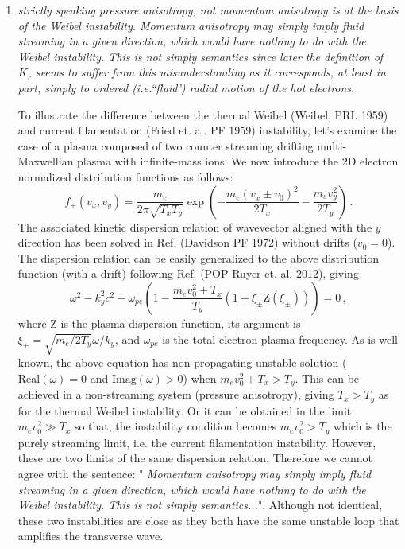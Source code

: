 \documentclass[aps,showpacs,superscriptaddress]{revtex4}%
\begin{document}
\begin{enumerate}
\item \textit{strictly speaking pressure anisotropy, not momentum anisotropy is at the basis of the Weibel instability. Momentum anisotropy may simply imply fluid streaming in a given direction, which would have nothing to do with the Weibel instability. This is not simply semantics since later the definition of $K_r$ seems to suffer from this misunderstanding as it corresponds, at least in part, simply to ordered (i.e.``fluid') radial motion of the hot electrons. }

To illustrate the difference between the thermal Weibel (Weibel, PRL 1959) and current filamentation (Fried et. al. PF 1959) instability, let's examine the case of a plasma composed of two counter streaming drifting multi-Maxwellian plasma with infinite-mass ions.
We now introduce the 2D electron normalized  distribution functions as follows:
 \begin{equation}
f_{ \pm}(v_x, v_y)  = \frac{ m_e }{2 \pi \sqrt{  T_x T_y  } }\exp\left( -\frac{ m_e (v_x \pm v_0)^2 }{ 2T_x }  -  \frac{ m_e v_y^2 }{ 2 T_y }\right) \, .
 \end{equation}
The associated kinetic dispersion relation of wavevector aligned with the $y$ direction has been solved in Ref.  (Davidson PF 1972) without drifts ($v_0=0$). The dispersion relation can be easily generalized to the above distribution function (with a drift)
following Ref. (POP Ruyer et. al. 2012),  giving
 \begin{equation}
 \omega^2 -k_y^2c^2 -  \omega_{pe}\left( 
1 -  \frac{ m_e v_0^2  + T_x }{ T_y }  ( 1 +\xi_\pm \mathrm{ Z }(\xi_\pm)  ) 
\right) =0 \, ,
 \end{equation}
where $ \mathrm{ Z }$ is the plasma dispersion function, its argument is $\xi_\pm =\sqrt{  m_e/2 T_y  }   \omega/k_y$, and 
$\omega_{pe}$ is the total electron plasma frequency. As is well known, the above equation has non-propagating unstable solution ($\mathrm{Real}(\omega)=0$ and $\mathrm{Imag}(\omega)>0$) when $m_e v_0^2  + T_x > T_y$.
This can be achieved in a non-streaming system (pressure anisotropy), giving $T_x > T_y$ as for the thermal Weibel instability. 
Or it can be obtained in the limit $m_e v_0^2  \gg T_x$ so that, the instability condition becomes  $m_e v_0^2  > T_y$ which is the purely streaming limit, i.e.  the current filamentation instability.
However, these are two limits of the same dispersion relation. Therefore we cannot agree with the sentence: " \textit{Momentum anisotropy may simply imply fluid streaming in a given direction, which would have nothing to do with the Weibel instability. This is not simply semantics...}". 
Although not identical, these two instabilities are   close as they both   have the same unstable loop that amplifies the transverse wave.


\end{enumerate}
\end{document}
